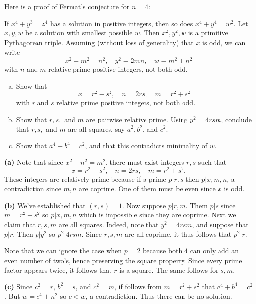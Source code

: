 \documentclass[11pt,letterpaper]{article}
\begin{document}
\begin{cproblem}{1.15}
  Here is a proof of Fermat's conjecture for $n=4$:
  \medskip
  \begin{solution} If $x^4+y^3=z^4$ has a solution in positive integers, then so does $x^4+y^4=w^2$. Let $x,y, w$ be a solution with smallest possible $w$. Then $x^2, y^2, w$ is a primitive Pythagorean triple. Assuming (without loss of generality) that $x$ is odd, we can write
  \[
    x^2=m^2-n^2, \quad y^2=2mn, \quad w=m^2+n^2
  \]
  with $n$ and $m$ relative prime positive integers, not both odd. \end{solution}
  \begin{enumerate}[(a)]
    \item Show that
    \[
      x=r^2-s^2, \quad n=2rs,\quad m=r^2+s^2
    \]
    with $r$ and $s$ relative prime positive integers, not both odd.
    \item Show that $r,s,$ and $m$ are pairwise relative prime. Using $y^2=4rsm$, conclude that $r, s,$ and $m$ are all squares, say $a^2, b^2$, and $c^2$.
    \item Show that $a^4+b^4=c^2$, and that this contradicts minimality of $w$.       
  \end{enumerate}     
\end{cproblem}

\begin{solution}
  \textbf{(a)} Note that since $x^2+n^2=m^2$, there must exist integers $r,s$ such that 
  \[
    x=r^2-s^2, \quad n=2rs,\quad m=r^2+s^2
  .\]  
  These integers are relatively prime because if a prime $p|r,s$ then $p|x,m,n$, a contradiction since $m,n$ are coprime. One of them must be even since $x$ is odd.      

  \textbf{(b)} We've established that $(r,s)=1$. Now suppose $p|r,m$. Them $p|s$ since $m=r^2+s^2$ so $p|x,m,n$ which is impossible since they are coprime. Next we claim that $r,s,m$ are all squares. Indeed, note that $y^2=4rsm$, and suppose that $p|r$. Then $p|y^2$ so $p^2|4rsm$. Since $r,s,m$ are all coprime, it thus follows that $p^2|r$. 
  
  Note that we can ignore the case when $p=2$ because both $4$ can only add an even number of two's, hence preserving the square property. Since every prime factor appears twice, it follows that $r$ is a square. The same follows for $s,m$.          

  \textbf{(c)} Since $a^2=r$, $b^2=s$, and $c^2=m$, if follows from $m=r^2+s^2$ that $a^4+b^4=c^2$. But $w=c^4+n^2$ so $c < w$, a contradiction. Thus there can be no solution.       
\end{solution}
\end{document}

